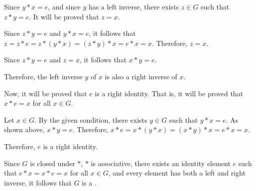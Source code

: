 \begin{enumerate}
\begin{subprove}
    Since \(y * x = e\), and since \(y\) has a left inverse, there exists \(z \in G\) such that \(z * y = e\).
    It will be proved that \(z = x\).
    
    Since \(z * y = e\) and \(y * x = e\), it follows that \(z = z * e = z * (y * x) = (z * y) * x = e * x = x\).
    Therefore, \(z = x\).
    
    Since \(z * y = e\) and \(z = x\), it follows that \(x * y = e\).
    
    Therefore, the left inverse \(y\) of \(x\) is also a right inverse of \(x\).
    
    Now, it will be proved that \(e\) is a right identity.
    That is, it will be proved that \(x * e = x\) for all \(x \in G\).
    
    Let \(x \in G\).
    By the given condition, there exists \(y \in G\) such that \(y * x = e\).
    As shown above, \(x * y = e\).
    Therefore, \(x * e = x * (y * x) = (x * y) * x = e * x = x\).
    
    Therefore, \(e\) is a right identity.
    
    Since \(G\) is closed under \(*\), \(*\) is associative, there exists an identity element \(e\) such that \(e * x = x * e = x\) for all \(x \in G\), and every element has both a left and right inverse, it follows that \(G\) is a .
  \end{subprove}
\end{enumerate}



















































